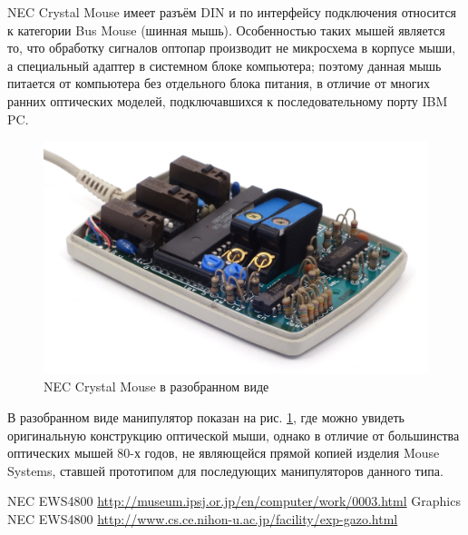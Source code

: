 \documentclass[11pt, a4paper]{article}
\begin{document}
NEC Crystal Mouse имеет разъём DIN и по интерфейсу подключения относится к категории Bus Mouse (шинная мышь). Особенностью таких мышей является то, что обработку сигналов оптопар производит не микросхема в корпусе мыши, а специальный адаптер в системном блоке компьютера; поэтому данная мышь питается от компьютера без отдельного блока питания, в отличие от многих ранних оптических моделей, подключавшихся к последовательному порту IBM PC. 

\begin{figure}[h]
    \centering
    \includegraphics[scale=0.8]{1986_nec_crystal_mouse/necraz_60.jpg}
    \caption{NEC Crystal Mouse в разобранном виде}
    \label{fig:NecCrystalInside}
\end{figure}

В разобранном виде манипулятор показан на рис. \ref{fig:NecCrystalInside}, где можно увидеть оригинальную конструкцию оптической мыши, однако в отличие от большинства оптических мышей 80-х годов, не являющейся прямой копией изделия Mouse Systems, ставшей прототипом для последующих манипуляторов данного типа.
    
\begin{thebibliography}{9}
 NEC EWS4800 \url{http://museum.ipsj.or.jp/en/computer/work/0003.html}
 Graphics NEC EWS4800 \url{http://www.cs.ce.nihon-u.ac.jp/facility/exp-gazo.html}
\end{thebibliography}
\end{document}
